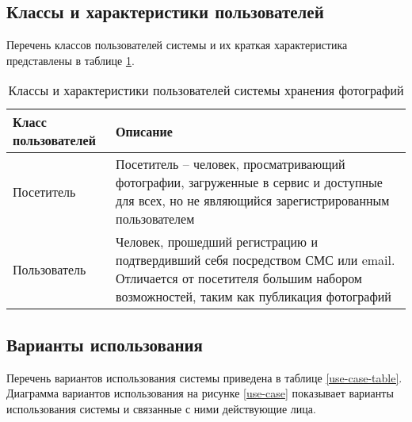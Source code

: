 \subsection{Классы и характеристики пользователей}

Перечень классов пользователей системы и их краткая характеристика представлены в таблице \ref{user-classes-table}.
\begin{table}[H]
  \caption{Классы и характеристики пользователей системы хранения фотографий}\label{user-classes-table}
  \begin{spacing}{1}
  \small
  \begin{tabular}{|p{5cm}|p{9cm}|}
  \hline Класс пользователей & Описание \\ 
  \hline Посетитель & Посетитель – человек, просматривающий фотографии, загруженные в сервис и доступные для всех, но не являющийся зарегистрированным пользователем \\ 
  \hline Пользователь & Человек, прошедший регистрацию и подтвердивший себя посредством СМС или email. Отличается от посетителя большим набором возможностей, таким как публикация фотографий \\ 
  \hline
  \end{tabular}
  \end{spacing}
\end{table}

\subsection{Варианты использования}
Перечень вариантов использования системы приведена в таблице \ref{use-case-table}.
Диаграмма вариантов использования на рисунке \ref{use-case} показывает варианты использования системы и связанные с ними действующие лица.

